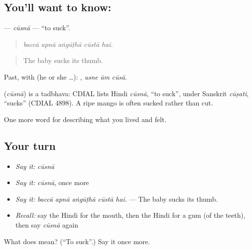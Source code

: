 \subsection*{You'll want to know: }
\textbf{} — \emph{cūsnā} — \textquotedblleft{}to suck\textquotedblright{}.

\begin{quote}
    
\end{quote}

\begin{quote}
\emph{baccā apnā aṅgūṭhā cūstā hai.}
\end{quote}

\begin{quote}
The baby sucks its thumb.
\end{quote}

Past, with  (he or she …):   , \emph{usne ām cūsā}.

\begin{cousinweb}
\textbf{} (\emph{cūsnā}) is a tadbhava: CDIAL lists Hindi \emph{cūsnā}, \textquotedblleft{}to suck\textquotedblright{}, under Sanskrit \emph{cūṣati}, \textquotedblleft{}sucks\textquotedblright{} (CDIAL 4898). A ripe mango is often sucked rather than cut.
\end{cousinweb}

\begin{grammarlens}[title={What you've built}]
One more word for describing what you lived and felt.
\end{grammarlens}

\subsection*{Your turn}
\begin{itemize}
\raggedright
  \item \emph{Say it:} \emph{cūsnā}
  \item \emph{Say it:} \emph{cūsnā}, once more
  \item \emph{Say it:} \emph{baccā apnā aṅgūṭhā cūstā hai.} — The baby sucks its thumb.
  \item \emph{Recall:} say the Hindi for the mouth, then the Hindi for a gum (of the teeth), then say \emph{cūsnā} again
\end{itemize}

\begin{tcolorbox}[breakable,colback=teal!4,colframe=teal!35!black,title={Before you move on}]
What does  mean? (\textquotedblleft{}To suck\textquotedblright{}.) Say it once more.
\end{tcolorbox}

